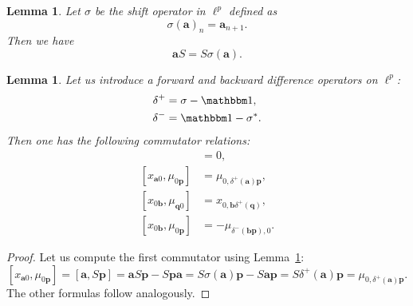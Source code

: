 \documentclass[a4paper,12pt,reqno]{amsart}%
\newtheorem{lemma}[theorem]{Lemma}
\theoremstyle{definition}
\theoremstyle{remark}
\numberwithin{theorem}{section}
\numberwithin{equation}{section}
\newcommand{\1}{{\bf 1}}
\newcommand{\Id}{\mathbbm 1}
\renewcommand\a{{\mathbf{a}}}
\renewcommand\b{{\mathbf{b}}}
\newcommand\p{{\mathbf{p}}}
\newcommand\q{{\mathbf{q}}}
\begin{document}
\begin{lemma}\label{lem:shift}
Let $\sigma$ be the shift operator in $\ell^p$ defined as
\[\sigma(\a)_n = \a_{n+1}.\]
Then we have 
\[\a S = S \sigma(\a).\] 
\end{lemma}

\begin{lemma}\label{lem:comm}
Let us introduce a forward and backward difference operators on $\ell^p$:
\begin{align*}\delta^+ &= \sigma - \Id,\\
\delta^- &= \Id - \sigma^*.\end{align*} 
Then one has the following commutator relations:
\begin{align*} [x_{\a0},\mu_{\q0}] &= 0,\\
[x_{\a0},\mu_{0\p}] &= \mu_{0,\delta^+(\a)\p},\\
[x_{0\b},\mu_{\q0}] &= x_{0,\b\delta^+(\q)},\\
[x_{0\b},\mu_{0\p}] &= -\mu_{\delta^-(\b\p),0}.
\end{align*}
\end{lemma}
\begin{proof}
Let us compute the first commutator using Lemma~\ref{lem:shift}:
\[ [x_{\a0},\mu_{0\p}] = [\a,S\p] = \a S\p - S\p\a = S\sigma(\a)\p-S\a\p = S\delta^+(\a)\p = \mu_{0,\delta^+(\a)\p}.\]
The other formulas follow analogously.
\end{proof}
\end{document}

